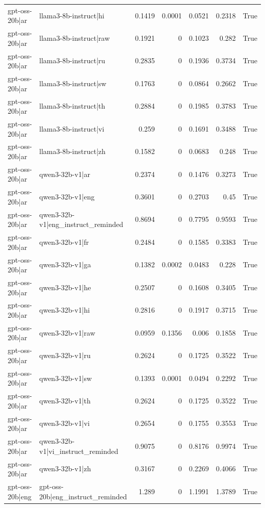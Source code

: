 \begin{table}
\begin{tabular}{l l r r r r l}
gpt-oss-20b|ar & llama3-8b-instruct|hi & 0.1419 & 0.0001 & 0.0521 & 0.2318 & True \\
gpt-oss-20b|ar & llama3-8b-instruct|raw & 0.1921 & 0 & 0.1023 & 0.282 & True \\
gpt-oss-20b|ar & llama3-8b-instruct|ru & 0.2835 & 0 & 0.1936 & 0.3734 & True \\
gpt-oss-20b|ar & llama3-8b-instruct|sw & 0.1763 & 0 & 0.0864 & 0.2662 & True \\
gpt-oss-20b|ar & llama3-8b-instruct|th & 0.2884 & 0 & 0.1985 & 0.3783 & True \\
gpt-oss-20b|ar & llama3-8b-instruct|vi & 0.259 & 0 & 0.1691 & 0.3488 & True \\
gpt-oss-20b|ar & llama3-8b-instruct|zh & 0.1582 & 0 & 0.0683 & 0.248 & True \\
gpt-oss-20b|ar & qwen3-32b-v1|ar & 0.2374 & 0 & 0.1476 & 0.3273 & True \\
gpt-oss-20b|ar & qwen3-32b-v1|eng & 0.3601 & 0 & 0.2703 & 0.45 & True \\
gpt-oss-20b|ar & qwen3-32b-v1|eng_instruct_reminded & 0.8694 & 0 & 0.7795 & 0.9593 & True \\
gpt-oss-20b|ar & qwen3-32b-v1|fr & 0.2484 & 0 & 0.1585 & 0.3383 & True \\
gpt-oss-20b|ar & qwen3-32b-v1|ga & 0.1382 & 0.0002 & 0.0483 & 0.228 & True \\
gpt-oss-20b|ar & qwen3-32b-v1|he & 0.2507 & 0 & 0.1608 & 0.3405 & True \\
gpt-oss-20b|ar & qwen3-32b-v1|hi & 0.2816 & 0 & 0.1917 & 0.3715 & True \\
gpt-oss-20b|ar & qwen3-32b-v1|raw & 0.0959 & 0.1356 & 0.006 & 0.1858 & True \\
gpt-oss-20b|ar & qwen3-32b-v1|ru & 0.2624 & 0 & 0.1725 & 0.3522 & True \\
gpt-oss-20b|ar & qwen3-32b-v1|sw & 0.1393 & 0.0001 & 0.0494 & 0.2292 & True \\
gpt-oss-20b|ar & qwen3-32b-v1|th & 0.2624 & 0 & 0.1725 & 0.3522 & True \\
gpt-oss-20b|ar & qwen3-32b-v1|vi & 0.2654 & 0 & 0.1755 & 0.3553 & True \\
gpt-oss-20b|ar & qwen3-32b-v1|vi_instruct_reminded & 0.9075 & 0 & 0.8176 & 0.9974 & True \\
gpt-oss-20b|ar & qwen3-32b-v1|zh & 0.3167 & 0 & 0.2269 & 0.4066 & True \\
gpt-oss-20b|eng & gpt-oss-20b|eng_instruct_reminded & 1.289 & 0 & 1.1991 & 1.3789 & True \\

\end{tabular}
\end{table}
